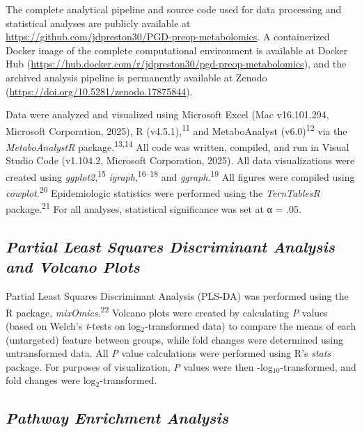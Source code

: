 \documentclass[
]{article}
\begin{document}
The complete analytical pipeline and source code used for data
processing and statistical analyses are publicly available at
\url{https://github.com/jdpreston30/PGD-preop-metabolomics}. A
containerized Docker image of the complete computational environment is
available at Docker Hub
(\url{https://hub.docker.com/r/jdpreston30/pgd-preop-metabolomics}), and
the archived analysis pipeline is permanently available at Zenodo
(\url{https://doi.org/10.5281/zenodo.17875844}).

\noindent\hspace{1.5em}Data were analyzed and visualized using Microsoft
Excel (Mac v16.101.294, Microsoft Corporation, 2025), R
(v4.5.1),\textsuperscript{11} and MetaboAnalyst
(v6.0)\textsuperscript{12} via the \textit{MetaboAnalystR}
package.\textsuperscript{13,14} All code was written, compiled, and run
in Visual Studio Code (v1.104.2, Microsoft Corporation, 2025). All data
visualizations were created using \textit{ggplot2},\textsuperscript{15}
\textit{igraph},\textsuperscript{16--18} and
\textit{ggraph}.\textsuperscript{19} All figures were compiled using
\textit{cowplot}.\textsuperscript{20} Epidemiologic statistics were
performed using the \textit{TernTablesR} package.\textsuperscript{21}
For all analyses, statistical significance was set at α = .05.

\subsection{\texorpdfstring{\emph{Partial Least Squares Discriminant
Analysis and Volcano
Plots}}{Partial Least Squares Discriminant Analysis and Volcano Plots}}\label{partial-least-squares-discriminant-analysis-and-volcano-plots}

Partial Least Squares Discriminant Analysis (PLS-DA) was performed using
the R package, \textit{mixOmics}.\textsuperscript{22} Volcano plots were
created by calculating \textit{P} values (based on Welch's
\textit{t}-tests on log\(_2\)-transformed data) to compare the means of
each (untargeted) feature between groups, while fold changes were
determined using untransformed data. All \textit{P} value calculations
were performed using R's \textit{stats} package. For purposes of
visualization, \textit{P} values were then -log\(_{10}\)-transformed,
and fold changes were log\(_2\)-transformed.

\subsection{\texorpdfstring{\emph{Pathway Enrichment
Analysis}}{Pathway Enrichment Analysis}}\label{pathway-enrichment-analysis}
\end{document}
